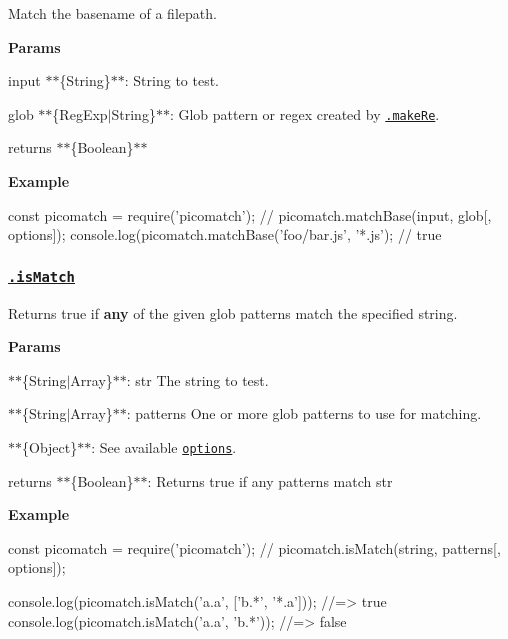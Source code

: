 Match the basename of a filepath.

{\bfseries Params}


\begin{DoxyItemize}
\item {\ttfamily input} $\ast$$\ast$\{String\}$\ast$$\ast$\+: String to test.
\item {\ttfamily glob} $\ast$$\ast$\{Reg\+Exp$\vert$\+String\}$\ast$$\ast$\+: Glob pattern or regex created by \href{#makeRe}{\tt .make\+Re}.
\item {\ttfamily returns} $\ast$$\ast$\{Boolean\}$\ast$$\ast$
\end{DoxyItemize}

{\bfseries Example}


\begin{DoxyCode}
const picomatch = require('picomatch');
// picomatch.matchBase(input, glob[, options]);
console.log(picomatch.matchBase('foo/bar.js', '*.js'); // true
\end{DoxyCode}


\subsubsection*{\href{lib/picomatch.js#L175}{\tt .is\+Match}}

Returns true if {\bfseries any} of the given glob {\ttfamily patterns} match the specified {\ttfamily string}.

{\bfseries Params}


\begin{DoxyItemize}
\item $\ast$$\ast$\{String$\vert$\+Array\}$\ast$$\ast$\+: str The string to test.
\item $\ast$$\ast$\{String$\vert$\+Array\}$\ast$$\ast$\+: patterns One or more glob patterns to use for matching.
\item $\ast$$\ast$\{Object\}$\ast$$\ast$\+: See available \href{#options}{\tt options}.
\item {\ttfamily returns} $\ast$$\ast$\{Boolean\}$\ast$$\ast$\+: Returns true if any patterns match {\ttfamily str}
\end{DoxyItemize}

{\bfseries Example}


\begin{DoxyCode}
const picomatch = require('picomatch');
// picomatch.isMatch(string, patterns[, options]);

console.log(picomatch.isMatch('a.a', ['b.*', '*.a'])); //=> true
console.log(picomatch.isMatch('a.a', 'b.*')); //=> false
\end{DoxyCode}


